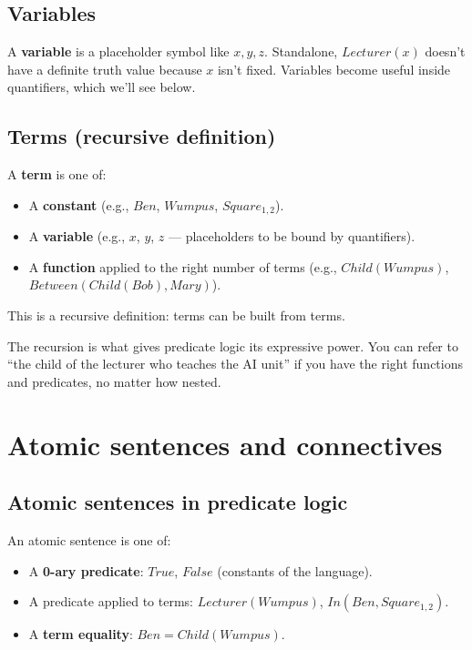 \documentclass[11pt, a4paper]{article}
\begin{document}
\subsection{Variables}

A \textbf{variable} is a placeholder symbol like $x, y, z$. Standalone, $Lecturer(x)$ doesn't have a definite truth value because $x$ isn't fixed. Variables become useful inside quantifiers, which we'll see below.

\subsection{Terms (recursive definition)}

\begin{defbox}[Term]
A \textbf{term} is one of:
\begin{itemize}[itemsep=0pt, topsep=0pt]
  \item A \textbf{constant} (e.g., $Ben$, $Wumpus$, $Square_{1,2}$).
  \item A \textbf{variable} (e.g., $x$, $y$, $z$ — placeholders to be bound by quantifiers).
  \item A \textbf{function} applied to the right number of terms (e.g., $Child(Wumpus)$, $Between(Child(Bob), Mary)$).
\end{itemize}
This is a recursive definition: terms can be built from terms.
\end{defbox}

The recursion is what gives predicate logic its expressive power. You can refer to ``the child of the lecturer who teaches the AI unit'' if you have the right functions and predicates, no matter how nested.

\section{Atomic sentences and connectives}

\subsection{Atomic sentences in predicate logic}

\begin{defbox}
An atomic sentence is one of:
\begin{itemize}[itemsep=0pt, topsep=0pt]
  \item A \textbf{0-ary predicate}: $True$, $False$ (constants of the language).
  \item A predicate applied to terms: $Lecturer(Wumpus)$, $In(Ben, Square_{1,2})$.
  \item A \textbf{term equality}: $Ben = Child(Wumpus)$.
\end{itemize}
\end{defbox}
\end{document}
